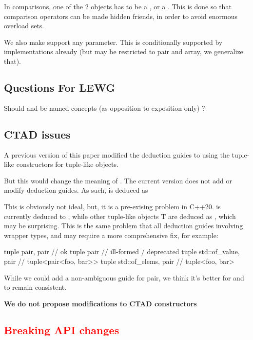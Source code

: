 \documentclass{wg21}
\begin{document}
In comparisons, one of the 2 objects has to be a , or a . This is done so that comparison operators can be made hidden friends, in order to avoid enormous overload sets.

We also make  support any  parameter.
This is conditionally supported by implementations already (but may be restricted to pair and array, we generalize that).

\subsection{Questions For LEWG}

Should  and  be named concepts (as opposition to exposition only) ?

\subsection{CTAD issues}

A previous version of this paper modified the deduction guides to using the tuple-like constructors for tuple-like objects.

But this would change the meaning of .
The current version does not add or modify deduction guides.
As such,  is deduced as 

This is obviously not ideal, but, it is a pre-exising problem in C++20.  is currently deduced to ,
while other tuple-like objects T are deduced as , which may be surprising.
This is the same problem that all deduction guides involving wrapper types, and may require a more comprehensive fix, for example:

\begin{colorblock}
tuple {pair, pair } // ok
tuple {pair} // ill-formed / deprecated
tuple {std::of_value, pair }  // tuple<pair<foo, bar>>
tuple {std::of_elems, pair }  // tuple<foo, bar>
\end{colorblock}

While we could add a non-ambiguous guide for pair, we think it's better for  and  to remain consistent.

\textbf{We do not propose modifications to CTAD constructors}


\subsection{\textcolor{Red}{Breaking API changes}}
\end{document}
